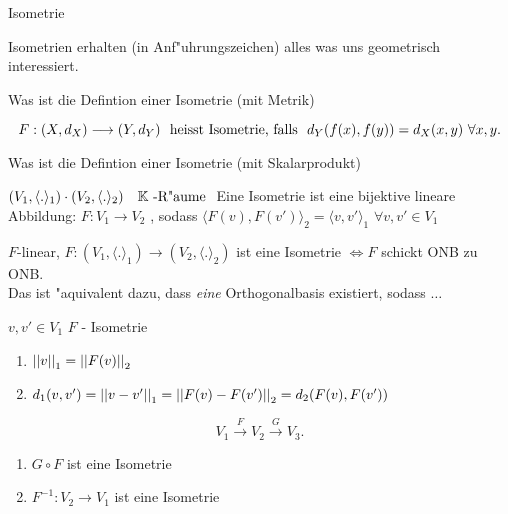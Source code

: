 \documentclass[class=article, crop=false]{standalone}
\begin{document}
\begin{zettel}{Isometrie}

    Isometrien erhalten (in Anf"uhrungszeichen) alles was uns geometrisch interessiert.
\begin{flashcard}
    \begin{question}
    Was ist die Defintion einer Isometrie (mit Metrik)
    \end{question}
    \begin{definition}
        \[
            F: (X,d_X) \longrightarrow (Y, d_Y)   \tx{ heisst Isometrie, falls } d_Y(f(x), f(y)) = d_X (x,y) \forall x,y
        .\]
    \end{definition}
\end{flashcard}

\begin{flashcard}
    \begin{question}
    Was ist die Defintion einer Isometrie (mit Skalarprodukt)
    \end{question}
    \begin{definition}
        $(V_1, \langle .\rangle_1 ) \cdot  (V_2, \langle .\rangle_2) \quad \mathbb{K}\text{ -R"aume }$  
        Eine Isometrie ist eine bijektive lineare Abbildung: $F: V_1 \to V_2$ , sodass $ \langle F(v),F(v')\rangle_2 = \langle v,v'\rangle_1$ $\forall v,v' \in  V_1$ 
    \end{definition}
\end{flashcard}

\begin{lemma}

$F$-linear, $F: (V_1, \langle .\rangle_1) \to (V_2, \langle .\rangle_2)$ ist eine Isometrie $\iff F$ schickt ONB zu ONB.\\
Das ist "aquivalent dazu, dass \emph{eine} Orthogonalbasis existiert, sodass $\dots$ 
\end{lemma}


\begin{remark}
$v,v' \in  V_1$ $F$ - Isometrie
\begin{enumerate}
    \item $ \left|\left|v\right|\right|_1 = \left|\left|F(v)\right|\right|_2$ 
    \item $d_1 (v,v') = \left|\left|v-v'\right|\right|_1 = \left|\left|F(v)-F(v')\right|\right|_2 = d_2 (F(v),F(v'))$ 
\end{enumerate}
\end{remark}

\begin{remark}
\[
    V_1 \stackrel{F}{\to} V_2 \stackrel{G}{\to} V_3
.\]
\begin{enumerate}
    \item $G \circ  F$ ist eine Isometrie
    \item $F^{-1}: V_2 \to  V_1$ ist eine Isometrie
\end{enumerate}


\end{remark}
\end{zettel}
\end{document}
